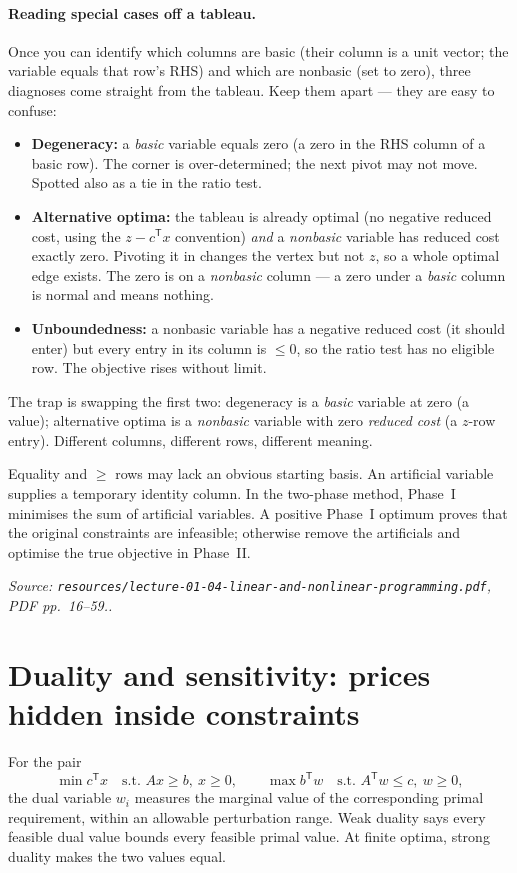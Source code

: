 \documentclass[11pt,a4paper]{article}
\renewcommand{\texttt}[1]{\nolinkurl{#1}}
\newcommand{\T}{\mathsf{T}}
\newcommand{\source}[1]{\par\smallskip\noindent\textit{Source: #1.}\par\smallskip}
\begin{document}
\paragraph{Reading special cases off a tableau.} Once you can identify which columns are basic (their column is a unit vector; the variable equals that row's RHS) and which are nonbasic (set to zero), three diagnoses come straight from the tableau. Keep them apart --- they are easy to confuse:
\begin{itemize}
\item \textbf{Degeneracy:} a \emph{basic} variable equals zero (a zero in the RHS column of a basic row). The corner is over-determined; the next pivot may not move. Spotted also as a tie in the ratio test.
\item \textbf{Alternative optima:} the tableau is already optimal (no negative reduced cost, using the $z-c^\T x$ convention) \emph{and} a \emph{nonbasic} variable has reduced cost exactly zero. Pivoting it in changes the vertex but not $z$, so a whole optimal edge exists. The zero is on a \emph{nonbasic} column --- a zero under a \emph{basic} column is normal and means nothing.
\item \textbf{Unboundedness:} a nonbasic variable has a negative reduced cost (it should enter) but every entry in its column is $\leq0$, so the ratio test has no eligible row. The objective rises without limit.
\end{itemize}
The trap is swapping the first two: degeneracy is a \emph{basic} variable at zero (a value); alternative optima is a \emph{nonbasic} variable with zero \emph{reduced cost} (a $z$-row entry). Different columns, different rows, different meaning.

Equality and $\geq$ rows may lack an obvious starting basis. An artificial variable supplies a temporary identity column. In the two-phase method, Phase~I minimises the sum of artificial variables. A positive Phase~I optimum proves that the original constraints are infeasible; otherwise remove the artificials and optimise the true objective in Phase~II.
\source{\texttt{resources/lecture-01-04-linear-and-nonlinear-programming.pdf}, PDF pp.~16--59.}

\section{Duality and sensitivity: prices hidden inside constraints}
For the pair
\[
 \min c^\T x\quad\text{s.t. }Ax\geq b,\ x\geq0,
 \qquad
 \max b^\T w\quad\text{s.t. }A^\T w\leq c,\ w\geq0,
\]
the dual variable $w_i$ measures the marginal value of the corresponding primal requirement, within an allowable perturbation range. Weak duality says every feasible dual value bounds every feasible primal value. At finite optima, strong duality makes the two values equal.
\end{document}
